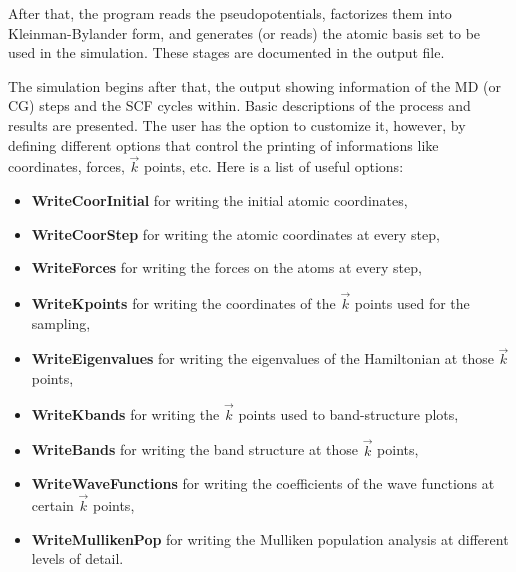 \documentclass[11pt]{article}
\begin{document}
After that, the program reads the pseudopotentials, factorizes them
into Kleinman-Bylander form, and generates (or reads) the atomic basis
set to be used in the simulation. These stages are documented in the
output file.

The simulation begins after that, the output showing information of
the MD (or CG) steps and the SCF cycles within.  Basic descriptions of
the process and results are presented. The user has the option to
customize it, however, by defining
different options that control the printing of informations like
coordinates, forces, $\vec k$ points, etc.  Here is a list of useful
options:
 
\begin{itemize}
\item
{\bf WriteCoorInitial}
for writing the initial atomic coordinates,
\item
{\bf WriteCoorStep}
for writing the atomic coordinates at every step,
\item
{\bf WriteForces}
for writing the forces on the atoms at every step,
\item
{\bf WriteKpoints}
for writing the coordinates of the $\vec k$ points used for the sampling,
\item
{\bf WriteEigenvalues}
for writing the eigenvalues of the Hamiltonian at those $\vec k$ points,
\item
{\bf WriteKbands}
for writing the $\vec k$ points used to band-structure plots,
\item
{\bf WriteBands}
for writing the band structure at those $\vec k$ points,
\item
{\bf WriteWaveFunctions}
for writing the coefficients of the wave functions at
certain $\vec k$ points,
\item
{\bf WriteMullikenPop}
for writing the Mulliken population analysis at different levels of detail.
\end{itemize}
\end{document}

